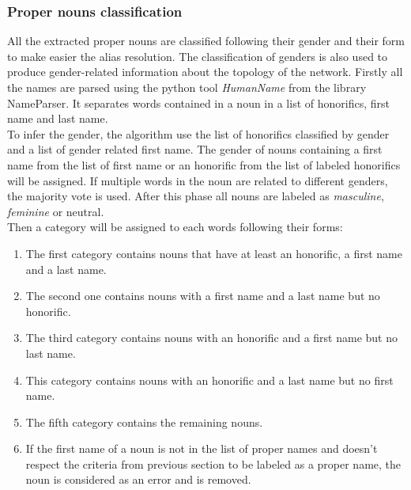 \documentclass[a4paper, 12pt]{report}
\begin{document}
\subsubsection{Proper nouns classification}
\label{section:classification}
All the extracted proper nouns are classified following their gender and their form to make easier the alias resolution. The classification of genders is also used to produce gender-related information about the topology of the network.
Firstly all the names are parsed using the python tool \textit{HumanName} from the library {NameParser}. It separates words contained in a noun in a list of honorifics, first name and last name.\\

To infer the gender, the algorithm use the list of honorifics classified by gender and a list of gender related first name. The gender of nouns containing a first name from the list of first name or an honorific from the list of  labeled honorifics will be assigned. If multiple words in the noun are related to different genders, the majority vote is used. After this phase all nouns are labeled as \textit{masculine}, \textit{feminine} or {neutral}.\\

Then a category will be assigned to each words following their forms:
\begin{enumerate}
	\item The first category contains nouns that have at least an honorific, a first name and a last name.
	\item The second one contains nouns with a first name and a last name but no honorific.
	\item The third category contains nouns with an honorific and a first name but no last name.
	\item This category contains nouns with an honorific and a last name but no first name.
	\item The fifth category contains the remaining nouns.
	 \item If the first name of a noun is not in the list of proper names and doesn't respect the criteria from previous section to be labeled as a proper name, the noun is considered as an error and is removed.
\end{enumerate}
\end{document}
